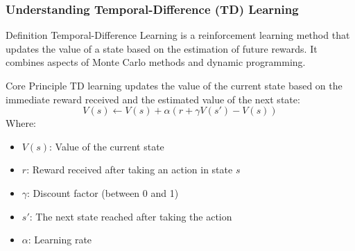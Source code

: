 \documentclass[aspectratio=169]{beamer}
\begin{document}
\begin{frame}[fragile]
    \frametitle{Understanding Temporal-Difference (TD) Learning}
    \begin{block}{Definition}
        Temporal-Difference Learning is a reinforcement learning method that updates the value of a state based on the estimation of future rewards. It combines aspects of Monte Carlo methods and dynamic programming.
    \end{block}
    
    \begin{block}{Core Principle}
        TD learning updates the value of the current state based on the immediate reward received and the estimated value of the next state:
        \begin{equation}
            V(s) \leftarrow V(s) + \alpha \left( r + \gamma V(s') - V(s) \right)
        \end{equation}
        Where:
        \begin{itemize}
            \item $V(s)$: Value of the current state
            \item $r$: Reward received after taking an action in state $s$
            \item $\gamma$: Discount factor (between 0 and 1)
            \item $s'$: The next state reached after taking the action
            \item $\alpha$: Learning rate
        \end{itemize}
    \end{block}
\end{frame}
\end{document}
